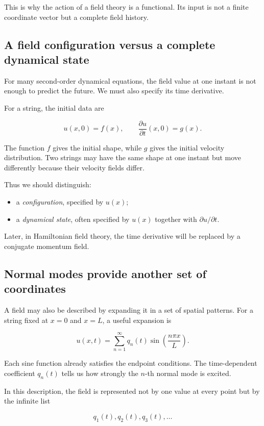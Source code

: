 This is why the action of a field theory is a functional. Its input is not a finite coordinate vector but a complete field history.

\subsection{A field configuration versus a complete dynamical state}

For many second-order dynamical equations, the field value at one instant is not enough to predict the future. We must also specify its time derivative.

For a string, the initial data are

\[
u(x,0)=f(x),
\qquad
\frac{\partial u}{\partial t}(x,0)=g(x).
\]

The function \(f\) gives the initial shape, while \(g\) gives the initial velocity distribution. Two strings may have the same shape at one instant but move differently because their velocity fields differ.

Thus we should distinguish:

\begin{itemize}
    \item a \emph{configuration}, specified by \(u(x)\);
    \item a \emph{dynamical state}, often specified by \(u(x)\) together with \(\partial u/\partial t\).
\end{itemize}

Later, in Hamiltonian field theory, the time derivative will be replaced by a conjugate momentum field.

\subsection{Normal modes provide another set of coordinates}

A field may also be described by expanding it in a set of spatial patterns. For a string fixed at \(x=0\) and \(x=L\), a useful expansion is

\[
u(x,t)
=
\sum_{n=1}^{\infty}
q_{n}(t)
\sin\left(\frac{n\pi x}{L}\right).
\]

Each sine function already satisfies the endpoint conditions. The time-dependent coefficient \(q_{n}(t)\) tells us how strongly the \(n\)-th normal mode is excited.

In this description, the field is represented not by one value at every point but by the infinite list

\[
q_{1}(t),q_{2}(t),q_{3}(t),\ldots
\]

